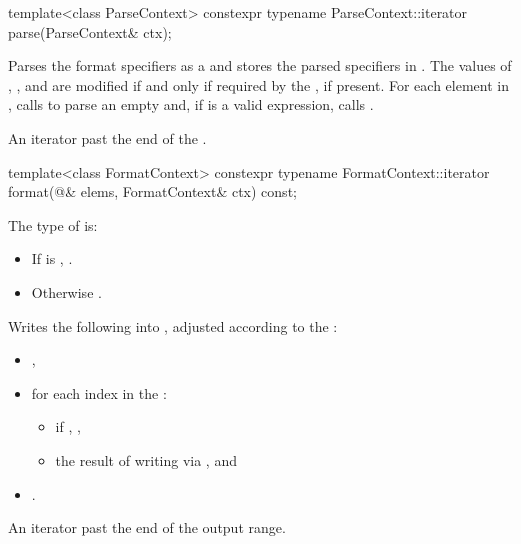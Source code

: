 %
\begin{itemdecl}
template<class ParseContext>
  constexpr typename ParseContext::iterator
    parse(ParseContext& ctx);
\end{itemdecl}

\begin{itemdescr}
\pnum
\effects
Parses the format specifiers as a  and
stores the parsed specifiers in .
The values of
,
, and
are modified if and only if
required by the , if present.
For each element  in ,
calls  to parse
an empty  and,
if  is a valid expression,
calls .

\pnum
\returns
An iterator past the end of the .
\end{itemdescr}

%
\begin{itemdecl}
template<class FormatContext>
  constexpr typename FormatContext::iterator
    format(@\seebelow@& elems, FormatContext& ctx) const;
\end{itemdecl}

\begin{itemdescr}
\pnum
The type of  is:
\begin{itemize}
\item
If  is ,
.
\item
Otherwise .
\end{itemize}

\pnum
\effects
Writes the following into ,
adjusted according to the :
\begin{itemize}
\item
{},
\item
for each index  in the :
\begin{itemize}
\item
if , ,
\item
the result of writing 
via , and
\end{itemize}
\item
{}.
\end{itemize}

\pnum
\returns
An iterator past the end of the output range.
\end{itemdescr}

